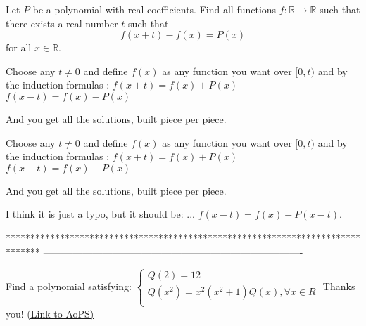 \begin{solution}
	\begin{tcolorbox}Let $P$ be a polynomial with real coefficients. Find all functions $f : \mathbb{R} \rightarrow \mathbb{R}$ such that there exists a real number $t$ such that
\[f(x+t) - f(x) = P(x)\]
for all $x \in \mathbb{R}$.\end{tcolorbox}
Choose any $t\ne 0$ and define $f(x)$ as any function you want over $[0,t)$ and by the induction formulas :
$f(x+t)=f(x)+P(x)$
$f(x-t)=f(x)-P(x)$

And you get all the solutions, built piece per piece.
\end{solution}



\begin{solution}
	\begin{tcolorbox}
Choose any $t\ne 0$ and define $f(x)$ as any function you want over $[0,t)$ and by the induction formulas :
$f(x+t)=f(x)+P(x)$
$f(x-t)=f(x)-P(x)$

And you get all the solutions, built piece per piece.\end{tcolorbox}
I think it is just a typo, but it should be:
...
$f(x-t)=f(x)-P(x-t)$.
\end{solution}
*******************************************************************************
-------------------------------------------------------------------------------

\begin{problem}
	Find a polynomial satisfying:
$\left\{ \begin{array}{l}
 Q\left( 2 \right) = 12 \\ 
 Q\left( {{x^2}} \right) = {x^2}\left( {{x^2} + 1} \right)Q\left( x \right),\forall x \in R \\ 
 \end{array} \right.$
Thanks you!
	\flushright \href{https://artofproblemsolving.com/community/c6h470956}{(Link to AoPS)}
\end{problem}



